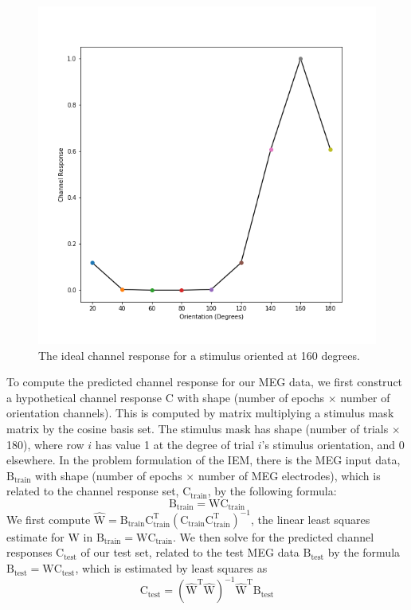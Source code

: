 \documentclass[../main.tex]{subfiles}
\begin{document}
\begin{figure}
    \centering
    \includegraphics[scale=0.7]{figures/methods/ideal_chan_resp.png}
    \caption{The ideal channel response for a stimulus oriented at 160 degrees.}
    \label{ideal_chan_resp}
\end{figure}

To compute the predicted channel response for our MEG data, we first construct a hypothetical channel
response $\mathrm{C}$ with shape (number of epochs $\times$ number of orientation channels). This is computed by matrix multiplying a stimulus mask matrix by the cosine basis set. The stimulus mask has shape (number of trials $\times$ 180), where row $i$ has value 1 at the degree of trial $i$'s stimulus orientation, and 0 elsewhere. In the problem formulation of the IEM, there is the MEG input data, $\mathrm{B_{train}}$ with shape (number of epochs $\times$ number of MEG electrodes), which is related to the channel response set, $\mathrm{C_{train}}$, by the following formula:
$$ \mathrm{B_{train} = W C_{train}}$$
We first compute $\mathrm{\hat{W} = B_{train} C_{train}^T (C_{train} C_{train}^T)^{-1}}$, the linear least squares estimate for W in $ \mathrm{B_{train} = W C_{train}}$. We then solve for the predicted channel responses $\mathrm{C_{test}}$  of our test set, related to the test MEG data $\mathrm{B_{test}}$ by the formula $\mathrm{B_{test} = W C_{test}}$, which is estimated by least squares as 
$$\mathrm{C_{test} = (\hat{W}^T \hat{W})^{-1} \hat{W}^T B_{test}}$$
\end{document}
